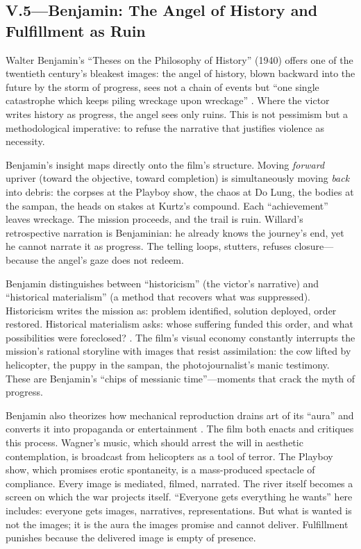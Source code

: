 \subsection*{V.5—Benjamin: The Angel of History and Fulfillment as Ruin}
\label{ssec:v-benjamin}
Walter Benjamin's ``Theses on the Philosophy of History'' (1940) offers one of the twentieth
century's bleakest images: the angel of history, blown backward into the future by the storm
of progress, sees not a chain of events but ``one single catastrophe which keeps piling
wreckage upon wreckage'' \parencite{BenjaminTheses1969}. Where the victor writes history as
progress, the angel sees only ruins. This is not pessimism but a methodological imperative: to
refuse the narrative that justifies violence as necessity.

Benjamin's insight maps directly onto the film's structure. Moving \emph{forward} upriver
(toward the objective, toward completion) is simultaneously moving \emph{back} into debris:
the corpses at the Playboy show, the chaos at Do Lung, the bodies at the sampan, the heads on
stakes at Kurtz's compound. Each ``achievement'' leaves wreckage. The mission proceeds, and
the trail is ruin. Willard's retrospective narration is Benjaminian: he already knows the
journey's end, yet he cannot narrate it as progress. The telling loops, stutters, refuses
closure---because the angel's gaze does not redeem.

Benjamin distinguishes between ``historicism'' (the victor's narrative) and ``historical
materialism'' (a method that recovers what was suppressed). Historicism writes the mission as:
problem identified, solution deployed, order restored. Historical materialism asks: whose
suffering funded this order, and what possibilities were foreclosed?
\parencite{BenjaminTheses1969}. The film's visual economy constantly interrupts the mission's
rational storyline with images that resist assimilation: the cow lifted by helicopter, the
puppy in the sampan, the photojournalist's manic testimony. These are Benjamin's ``chips of
messianic time''---moments that crack the myth of progress.

Benjamin also theorizes how mechanical reproduction drains art of its ``aura'' and converts it
into propaganda or entertainment \parencite{BenjaminArtwork1969}. The film both enacts and
critiques this process. Wagner's music, which should arrest the will in aesthetic
contemplation, is broadcast from helicopters as a tool of terror. The Playboy show, which
promises erotic spontaneity, is a mass-produced spectacle of compliance. Every image is
mediated, filmed, narrated. The river itself becomes a screen on which the war projects itself.
``Everyone gets everything he wants'' here includes: everyone gets images, narratives,
representations. But what is wanted is not the images; it is the aura the images promise and
cannot deliver. Fulfillment punishes because the delivered image is empty of presence.

